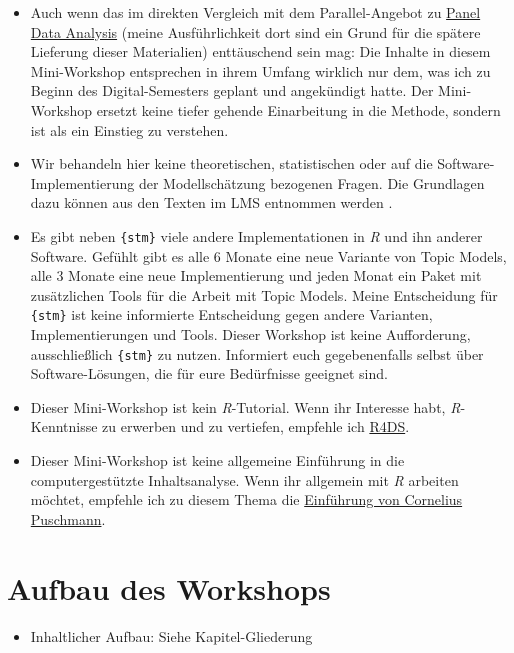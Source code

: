 \documentclass[
]{book}
\providecommand{\tightlist}{%
  \setlength{\itemsep}{0pt}\setlength{\parskip}{0pt}}
\begin{document}
\begin{itemize}
\item
  Auch wenn das im direkten Vergleich mit dem Parallel-Angebot zu \href{https://bachl.github.io/workshop_panel/}{Panel Data Analysis} (meine Ausführlichkeit dort sind ein Grund für die spätere Lieferung dieser Materialien) enttäuschend sein mag: Die Inhalte in diesem Mini-Workshop entsprechen in ihrem Umfang wirklich nur dem, was ich zu Beginn des Digital-Semesters geplant und angekündigt hatte. Der Mini-Workshop ersetzt keine tiefer gehende Einarbeitung in die Methode, sondern ist als ein Einstieg zu verstehen.
\item
  Wir behandeln hier keine theoretischen, statistischen oder auf die Software-Implementierung der Modellschätzung bezogenen Fragen. Die Grundlagen dazu können aus den Texten im LMS entnommen werden \citep{maierApplyingLDATopic2018, robertsStmPackageStructural2019}.
\item
  Es gibt neben \texttt{\{stm\}} viele andere Implementationen in \emph{R} und ihn anderer Software. Gefühlt gibt es alle 6 Monate eine neue Variante von Topic Models, alle 3 Monate eine neue Implementierung und jeden Monat ein Paket mit zusätzlichen Tools für die Arbeit mit Topic Models. Meine Entscheidung für \texttt{\{stm\}} ist keine informierte Entscheidung gegen andere Varianten, Implementierungen und Tools. Dieser Workshop ist keine Aufforderung, ausschließlich \texttt{\{stm\}} zu nutzen. Informiert euch gegebenenfalls selbst über Software-Lösungen, die für eure Bedürfnisse geeignet sind.
\item
  Dieser Mini-Workshop ist kein \emph{R}-Tutorial. Wenn ihr Interesse habt, \emph{R}-Kenntnisse zu erwerben und zu vertiefen, empfehle ich \href{https://r4ds.had.co.nz/}{R4DS}.
\item
  Dieser Mini-Workshop ist keine allgemeine Einführung in die computergestützte Inhaltsanalyse. Wenn ihr allgemein mit \emph{R} arbeiten möchtet, empfehle ich zu diesem Thema die \href{http://inhaltsanalyse-mit-r.de/}{Einführung von Cornelius Puschmann}.
\end{itemize}

\hypertarget{aufbau-des-workshops}{%
\section{Aufbau des Workshops}\label{aufbau-des-workshops}}

\begin{itemize}
\tightlist
\item
  Inhaltlicher Aufbau: Siehe Kapitel-Gliederung
\end{itemize}
\end{document}
